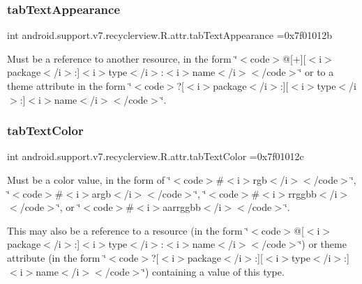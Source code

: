 \subsubsection{\texorpdfstring{tab\+Text\+Appearance}{tabTextAppearance}}
{\footnotesize\ttfamily int android.\+support.\+v7.\+recyclerview.\+R.\+attr.\+tab\+Text\+Appearance =0x7f01012b\hspace{0.3cm}{\ttfamily [static]}}

Must be a reference to another resource, in the form \char`\"{}$<$code$>$@\mbox{[}+\mbox{]}\mbox{[}$<$i$>$package$<$/i$>$\+:\mbox{]}$<$i$>$type$<$/i$>$\+:$<$i$>$name$<$/i$>$$<$/code$>$\char`\"{} or to a theme attribute in the form \char`\"{}$<$code$>$?\mbox{[}$<$i$>$package$<$/i$>$\+:\mbox{]}\mbox{[}$<$i$>$type$<$/i$>$\+:\mbox{]}$<$i$>$name$<$/i$>$$<$/code$>$\char`\"{}. \mbox{\label{classandroid_1_1support_1_1v7_1_1recyclerview_1_1R_1_1attr_ad7fb80657fe7892f83ef7b902b19ad28}} 
\subsubsection{\texorpdfstring{tab\+Text\+Color}{tabTextColor}}
{\footnotesize\ttfamily int android.\+support.\+v7.\+recyclerview.\+R.\+attr.\+tab\+Text\+Color =0x7f01012c\hspace{0.3cm}{\ttfamily [static]}}

Must be a color value, in the form of \char`\"{}$<$code$>$\#$<$i$>$rgb$<$/i$>$$<$/code$>$\char`\"{}, \char`\"{}$<$code$>$\#$<$i$>$argb$<$/i$>$$<$/code$>$\char`\"{}, \char`\"{}$<$code$>$\#$<$i$>$rrggbb$<$/i$>$$<$/code$>$\char`\"{}, or \char`\"{}$<$code$>$\#$<$i$>$aarrggbb$<$/i$>$$<$/code$>$\char`\"{}. 

This may also be a reference to a resource (in the form \char`\"{}$<$code$>$@\mbox{[}$<$i$>$package$<$/i$>$\+:\mbox{]}$<$i$>$type$<$/i$>$\+:$<$i$>$name$<$/i$>$$<$/code$>$\char`\"{}) or theme attribute (in the form \char`\"{}$<$code$>$?\mbox{[}$<$i$>$package$<$/i$>$\+:\mbox{]}\mbox{[}$<$i$>$type$<$/i$>$\+:\mbox{]}$<$i$>$name$<$/i$>$$<$/code$>$\char`\"{}) containing a value of this type. \mbox{\label{classandroid_1_1support_1_1v7_1_1recyclerview_1_1R_1_1attr_ac10a448074b0197720ea1ee696e4c934}} 
